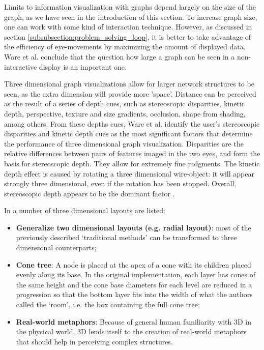 Limits to information visualization with graphs depend largely on the size of the graph, as we have seen in the introduction of this section. To increase graph size, one can work with some kind of interaction technique\cite{herman:2000, ware:2008}. However, as discussed in section \ref{subsubsection:problem_solving_loop}, it is better to take advantage of the efficiency of eye-movements by maximizing the amount of displayed data\cite{ware:2004, ware:2008}. Ware et al. conclude that the question how large a graph can be seen in a non-interactive display is an important one\cite{ware:2008}.

Three dimensional graph visualizations allow for larger network structures to be seen, as the extra dimension will provide more 'space'\cite{herman:2000, ware:2008}. Distance can be perceived as the result of a series of depth cues, such as stereoscopic disparities, kinetic depth, perspective, texture and size gradients, occlusion, shape from shading, among others. From these depths cues, Ware et al. \cite{ware:2008} identify the user's stereoscopic disparities and kinetic depth cues as the most significant factors that determine the performance of three dimensional graph visualization. Disparities are the relative differences between pairs of features imaged in the two eyes, and form the basis for stereoscopic depth. They allow for extremely fine judgments. The kinetic depth effect is caused by rotating a three dimensional wire-object: it will appear strongly three dimensional, even if the rotation has been stopped. Overall, stereoscopic depth appears to be the dominant factor \cite{ware:2008}.

In \cite{herman:2000} a number of three dimensional layouts are listed:

\begin{itemize}
	\item \textbf{Generalize two dimensional layouts} \textbf{(e.g. radial layout)}: most of the previously described ‘traditional methods’ can be transformed to three dimensional counterparts;
	\item \textbf{Cone tree}: A node is placed at the apex of a cone with its children placed evenly along its base. In the original implementation, each layer has cones of the same height and the cone base diameters for each level are reduced in a progression so that the bottom layer fits into the width of what the authors called the ‘room’, i.e. the box containing the full cone tree;
	\item \textbf{Real-world metaphors}: Because of general human familiarity with 3D in the physical world, 3D lends itself to the creation of real-world metaphors that should help in perceiving complex structures.
\end{itemize}


